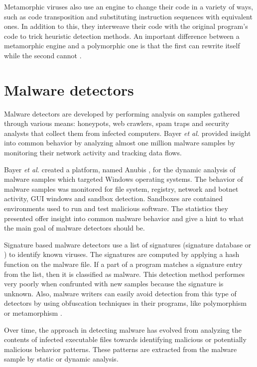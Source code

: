 Metamorphic viruses also use an engine to change their code in a variety of ways, such as code transposition and substituting instruction sequences with equivalent ones. In addition to this, they interweave their code with the original program's code to trick heuristic detection methods. An important difference between a metamorphic engine and a polymorphic one is that the first can rewrite itself while the second cannot \cite{testing-mal-det}.

\section{Malware detectors}
\label{sec:mal-detectors}

Malware detectors are developed by performing analysis on samples gathered through various means: honeypots, web crawlers, spam traps and security analysts that collect them from infected computers. Bayer \textit{et al.} \cite{current-mal-behavior} provided insight into common behavior by analyzing almost one million malware samples by monitoring their network activity and tracking data flows.

Bayer \textit{et al.} created a platform, named Anubis \cite{anubis-platform}, for the dynamic analysis of malware samples which targeted Windows operating systems. The behavior of malware samples was monitored for file system, registry, network and botnet activity, GUI windows and sandbox detection. Sandboxes are contained environments used to run and test malicious software. The statistics they presented offer insight into common malware behavior and give a hint to what the main goal of malware detectors should be.

Signature based malware detectors use a list of signatures (signature database or ) to identify known viruses. The signatures are computed by applying a hash function on the malware file. If a part of a program matches a signature entry from the list, then it is classified as malware. This detection method performes very poorly when confrunted with new samples because the signature is unknown. Also, malware writers can easily avoid detection from this type of detectors by using obfuscation techniques in their programs, like polymorphism or metamorphism \cite{mining-specifications}. 

Over time, the approach in detecting malware has evolved from analyzing the contents of infected executable files towards identifying malicious or potentially malicious behavior patterns. These patterns are extracted from the malware sample by static or dynamic analysis.

